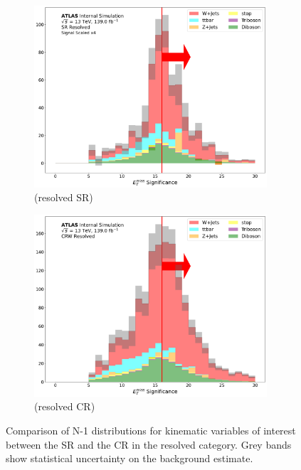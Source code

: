 \begin{figure}[htbp]
  \begin{subfigure}{0.45\textwidth}
     \includegraphics[width = 0.95\textwidth]{Figures/App_SR_CR_distributions/SR1L_Resolved/MetTST_Significance_N_1.pdf}
    \caption{\metsig (resolved SR)}
     \end{subfigure}
    \begin{subfigure}{0.45\textwidth}
     \includegraphics[width = 0.95\textwidth]{Figures/App_SR_CR_distributions/CRW_Resolved/MetTST_Significance_N_1.pdf}
     \caption{\metsig (resolved \wjets CR)}
     \end{subfigure}
      \caption{Comparison of N-1 distributions for kinematic variables of interest between the SR and the \wjets CR in the resolved category. Grey bands show statistical uncertainty on the background estimate.}
     \label{fig:N_1_CRW_resolved}    
     \end{figure}

